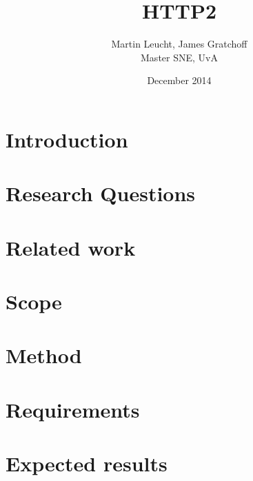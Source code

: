 \documentclass{article}
\begin{document}
 
\begin{figure}[!bh]
 	\begin{center}
		\huge \title{HTTP2}
		\author{ Martin Leucht, James Gratchoff \\
		Master SNE, UvA} 
		\date{December 2014\\}
	\maketitle 
		\label{sec:uva}
	\end{center}
\end{figure}
\setlength{\columnsep}{2cm}
\def\columnseprulecolor{\color{blue}}
 
\begin{multicols}{2}
\section{Introduction}

\section{Research Questions}

\section{Related work}

\section{Scope}

\section{Method}

\section{Requirements}

\section{Expected results}


\begin{thebibliography}
\\
\end{thebibliography}
\newpage
\appendix

\end{multicols}
\end{document}
